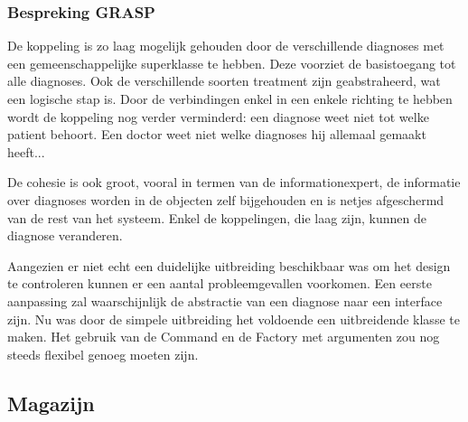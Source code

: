 \documentclass[a4paper]{article}
\begin{document}
\subsubsection{Bespreking GRASP}
De koppeling is zo laag mogelijk gehouden door de verschillende diagnoses met een gemeenschappelijke superklasse te hebben. Deze voorziet de basistoegang tot alle diagnoses. Ook de verschillende soorten treatment zijn geabstraheerd, wat een logische stap is. Door de verbindingen enkel in een enkele richting te hebben wordt de koppeling nog verder verminderd: een diagnose weet niet tot welke patient behoort. Een doctor weet niet welke diagnoses hij allemaal gemaakt heeft... 

De cohesie is ook groot, vooral in termen van de informationexpert, de informatie over diagnoses worden in de objecten zelf bijgehouden en is netjes afgeschermd van de rest van het systeem. Enkel de koppelingen, die laag zijn, kunnen de diagnose veranderen.

Aangezien er niet echt een duidelijke uitbreiding beschikbaar was om het design te controleren kunnen er een aantal probleemgevallen voorkomen. Een eerste aanpassing zal waarschijnlijk de abstractie van een diagnose naar een interface zijn. Nu was door de simpele uitbreiding het voldoende een uitbreidende klasse te maken. Het gebruik van de Command en de Factory met argumenten zou nog steeds flexibel genoeg moeten zijn.


\subsection{Magazijn}
\end{document}
